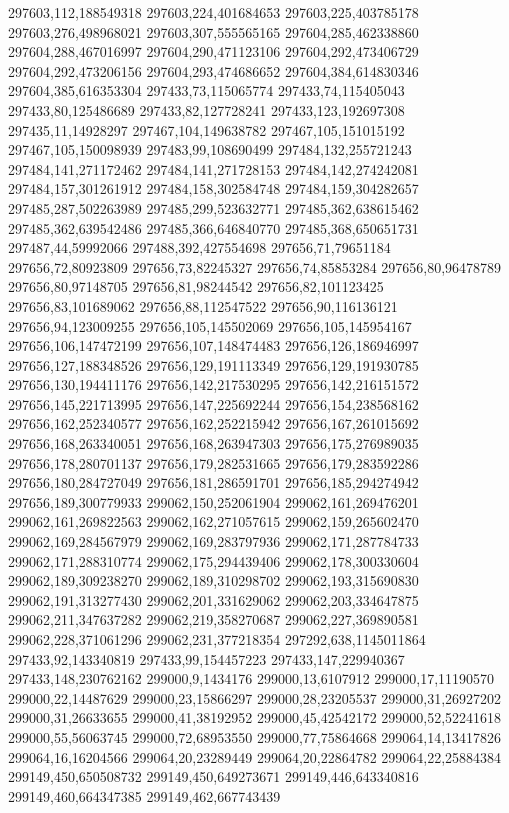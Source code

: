 297603,112,188549318
297603,224,401684653
297603,225,403785178
297603,276,498968021
297603,307,555565165
297604,285,462338860
297604,288,467016997
297604,290,471123106
297604,292,473406729
297604,292,473206156
297604,293,474686652
297604,384,614830346
297604,385,616353304
297433,73,115065774
297433,74,115405043
297433,80,125486689
297433,82,127728241
297433,123,192697308
297435,11,14928297
297467,104,149638782
297467,105,151015192
297467,105,150098939
297483,99,108690499
297484,132,255721243
297484,141,271172462
297484,141,271728153
297484,142,274242081
297484,157,301261912
297484,158,302584748
297484,159,304282657
297485,287,502263989
297485,299,523632771
297485,362,638615462
297485,362,639542486
297485,366,646840770
297485,368,650651731
297487,44,59992066
297488,392,427554698
297656,71,79651184
297656,72,80923809
297656,73,82245327
297656,74,85853284
297656,80,96478789
297656,80,97148705
297656,81,98244542
297656,82,101123425
297656,83,101689062
297656,88,112547522
297656,90,116136121
297656,94,123009255
297656,105,145502069
297656,105,145954167
297656,106,147472199
297656,107,148474483
297656,126,186946997
297656,127,188348526
297656,129,191113349
297656,129,191930785
297656,130,194411176
297656,142,217530295
297656,142,216151572
297656,145,221713995
297656,147,225692244
297656,154,238568162
297656,162,252340577
297656,162,252215942
297656,167,261015692
297656,168,263340051
297656,168,263947303
297656,175,276989035
297656,178,280701137
297656,179,282531665
297656,179,283592286
297656,180,284727049
297656,181,286591701
297656,185,294274942
297656,189,300779933
299062,150,252061904
299062,161,269476201
299062,161,269822563
299062,162,271057615
299062,159,265602470
299062,169,284567979
299062,169,283797936
299062,171,287784733
299062,171,288310774
299062,175,294439406
299062,178,300330604
299062,189,309238270
299062,189,310298702
299062,193,315690830
299062,191,313277430
299062,201,331629062
299062,203,334647875
299062,211,347637282
299062,219,358270687
299062,227,369890581
299062,228,371061296
299062,231,377218354
297292,638,1145011864
297433,92,143340819
297433,99,154457223
297433,147,229940367
297433,148,230762162
299000,9,1434176
299000,13,6107912
299000,17,11190570
299000,22,14487629
299000,23,15866297
299000,28,23205537
299000,31,26927202
299000,31,26633655
299000,41,38192952
299000,45,42542172
299000,52,52241618
299000,55,56063745
299000,72,68953550
299000,77,75864668
299064,14,13417826
299064,16,16204566
299064,20,23289449
299064,20,22864782
299064,22,25884384
299149,450,650508732
299149,450,649273671
299149,446,643340816
299149,460,664347385
299149,462,667743439
